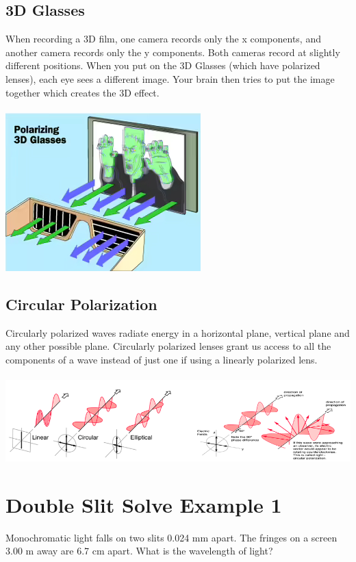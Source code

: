 \documentclass{article}
\begin{document}
\subsection{3D Glasses}
When recording a 3D film, one camera records only the x components, and another camera records only the y components. Both cameras record at slightly different positions.
When you put on the 3D Glasses (which have polarized lenses), each eye sees a different image. Your brain then tries to put the image together which creates the 3D effect.\\\\
\includegraphics[scale=0.35]{images/3d_glasses} \\

\subsection{Circular Polarization}
Circularly polarized waves radiate energy in a horizontal plane, vertical plane and any other possible plane. Circularly polarized lenses grant us access to all the components of a wave instead of just one if using a linearly polarized lens.\\\\
\includegraphics[scale=0.5]{images/circular_polarization}\\

\section*{Double Slit Solve Example 1}
Monochromatic light falls on two slits 0.024 mm apart. The fringes on a screen 3.00 m away are 6.7 cm apart. What is the wavelength of light?
\end{document}
